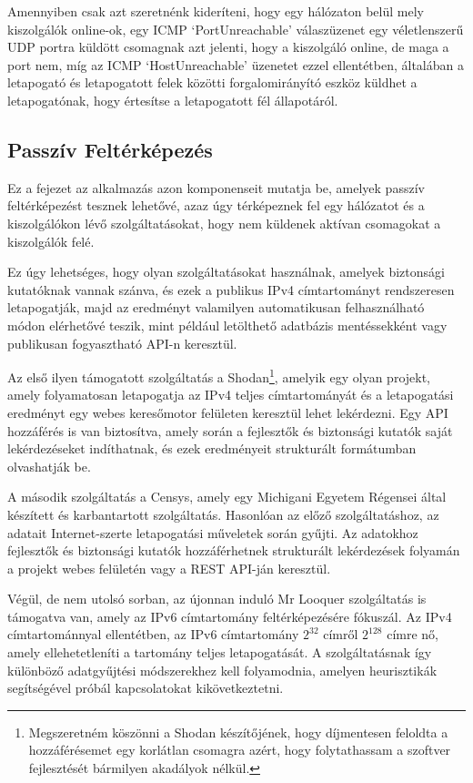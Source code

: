 	Amennyiben csak azt szeretnénk kideríteni, hogy egy hálózaton belül mely kiszolgálók online-ok, egy ICMP `PortUnreachable' válaszüzenet egy véletlenszerű UDP portra küldött csomagnak azt jelenti, hogy a kiszolgáló online, de maga a port nem, míg az ICMP `HostUnreachable' üzenetet ezzel ellentétben, általában a letapogató és letapogatott felek közötti forgalomirányító eszköz küldhet a letapogatónak, hogy értesítse a letapogatott fél állapotáról.

\subsection*{Passzív Feltérképezés}

	Ez a fejezet az alkalmazás azon komponenseit mutatja be, amelyek passzív feltérképezést tesznek lehetővé, azaz úgy térképeznek fel egy hálózatot és a kiszolgálókon lévő szolgáltatásokat, hogy nem küldenek aktívan csomagokat a kiszolgálók felé.
	
	Ez úgy lehetséges, hogy olyan szolgáltatásokat használnak, amelyek biztonsági kutatóknak vannak szánva, és ezek a publikus IPv4 címtartományt rendszeresen letapogatják, majd az eredményt valamilyen automatikusan felhasználható módon elérhetővé teszik, mint például letölthető adatbázis mentéssekként vagy publikusan fogyasztható API-n keresztül.
	
	Az első ilyen támogatott szolgáltatás a Shodan\footnote{Megszeretném köszönni a Shodan készítőjének, hogy díjmentesen feloldta a hozzáférésemet egy korlátlan csomagra azért, hogy folytathassam a szoftver fejlesztését bármilyen akadályok nélkül.}\cite{shodan16}, amelyik egy olyan projekt, amely folyamatosan letapogatja az IPv4 teljes címtartományát és a letapogatási eredményt egy webes keresőmotor felületen keresztül lehet lekérdezni. Egy API hozzáférés is van biztosítva, amely során a fejlesztők és biztonsági kutatók saját lekérdezéseket indíthatnak, és ezek eredményeit strukturált formátumban olvashatják be.
	
	A második szolgáltatás a Censys\cite{censys15}, amely egy Michigani Egyetem Régensei által készített és karbantartott szolgáltatás. Hasonlóan az előző szolgáltatáshoz, az adatait Internet-szerte letapogatási műveletek során gyűjti. Az adatokhoz fejlesztők és biztonsági kutatók hozzáférhetnek strukturált lekérdezések folyamán a projekt webes felületén vagy a REST API-ján keresztül.
	
	Végül, de nem utolsó sorban, az újonnan induló Mr Looquer\cite{looquer16} szolgáltatás is támogatva van, amely az IPv6 címtartomány feltérképezésére fókuszál. Az IPv4 címtartománnyal ellentétben, az IPv6 címtartomány $ 2^{32} $ címről $ 2^{128} $ címre nő, amely ellehetetleníti a tartomány teljes letapogatását. A szolgáltatásnak így különböző adatgyűjtési módszerekhez kell folyamodnia, amelyen heurisztikák segítségével próbál kapcsolatokat kikövetkeztetni.
	
